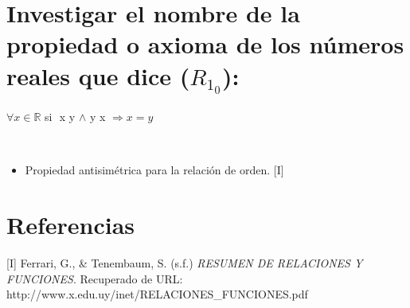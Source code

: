 \documentclass[12pt]{article}
\begin{document}
\section{Investigar el nombre de la propiedad o axioma de los números reales que dice ($R_1_0$):}

\begin{center}
$\forall x\in \mathbb{R} $ si $  $ x \leq y $ \wedge $ y \leq x $ \Rightarrow x=y$
\end{center}

{}\\

\begin{itemize}
    \item Propiedad antisimétrica para la relación de orden. [I]
\end{itemize}

\section{Referencias}
[I] Ferrari, G., \& Tenembaum, S. (s.f.) \textit{RESUMEN DE RELACIONES Y FUNCIONES}. Recuperado de URL: http://www.x.edu.uy/inet/RELACIONES\_FUNCIONES.pdf
\end{document}
